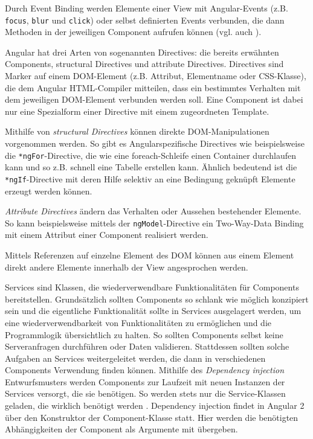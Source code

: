Durch Event Binding werden Elemente einer View mit Angular-Events (z.B. \texttt{focus}, \texttt{blur} und \texttt{click}) oder selbst definierten Events verbunden, die dann Methoden in der jeweiligen Component aufrufen können (vgl. auch  \cite{PrechtAngularTemplateSyntax}).

Angular hat drei Arten von sogenannten Directives: die bereits erwähnten Components, structural Directives und attribute Directives. Directives sind Marker auf einem DOM-Element (z.B. Attribut, Elementname oder CSS-Klasse), die dem Angular HTML-Compiler mitteilen, dass ein bestimmtes Verhalten mit dem jeweiligen DOM-Element verbunden werden soll. Eine Component ist dabei nur eine Spezialform einer Directive mit einem zugeordneten Template.

Mithilfe von \emph{structural Directives} können direkte DOM-Manipulationen vorgenommen werden. So gibt es Angularspezifische Directives wie beispielsweise die  \texttt{*ngFor}-Directive, die wie eine foreach-Schleife einen Container durchlaufen kann und so z.B. schnell eine Tabelle erstellen kann. Ähnlich bedeutend ist die \texttt{*ngIf}-Directive mit deren Hilfe selektiv an eine Bedingung geknüpft Elemente erzeugt werden können.

\emph{Attribute Directives} ändern das Verhalten oder Aussehen bestehender Elemente. So kann beispielsweise mittels der \texttt{ngModel}-Directive ein Two-Way-Data Binding mit einem Attribut einer Component realisiert werden. 

Mittels Referenzen auf einzelne Element des DOM können aus einem Element direkt andere Elemente innerhalb der View angesprochen werden.

Services sind Klassen, die wiederverwendbare Funktionalitäten für Components bereitstellen. Grundsätzlich sollten Components so schlank wie möglich konzipiert sein und die eigentliche Funktionalität sollte in Services ausgelagert werden, um eine wiederverwendbarkeit von Funktionalitäten zu ermöglichen und die Programmlogik übersichtlich zu halten. So sollten Components selbst keine Serveranfragen durchführen oder Daten validieren. Stattdessen sollten solche Aufgaben an Services weitergeleitet werden, die dann in verschiedenen Components Verwendung finden können.
%
Mithilfe des \emph{Dependency injection} Entwurfsmusters \cite{angularDependencyInjectionDoku} werden Components zur Laufzeit mit neuen Instanzen der Services versorgt, die sie benötigen. So werden stets nur die Service-Klassen geladen, die wirklich benötigt werden \cite{angularDocuBasicArchitecture}. Dependency injection findet in Angular 2 über den Konstruktor der Component-Klasse statt. Hier werden die benötigten Abhängigkeiten der Component als Argumente mit übergeben.
%
%
